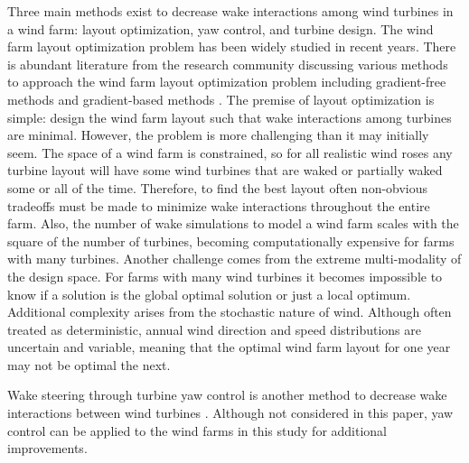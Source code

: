 Three main methods exist to decrease wake interactions among wind turbines in a wind farm: layout optimization, yaw control, and turbine design. The wind farm layout optimization problem has been widely studied in recent years. There is abundant literature from the research community discussing various methods to approach the wind farm layout optimization problem including gradient-free methods \citep{marmidis2008optimal,emami2010new,kusiak2010design,ituarte2011optimization,feng2015solving,gao2015wind} and gradient-based methods \citep{perez2013offshore,park2015layout,Fleming2016,guirguis2016toward,gebraad2017maximization}. The premise of layout optimization is simple: design the wind farm layout such that wake interactions among turbines are minimal.
However, the problem is more challenging than it may initially seem. 
The space of a wind farm is constrained, so for all realistic wind roses any turbine layout will have some wind turbines that are waked or partially waked some or all of the time. Therefore, to find the best layout often non-obvious tradeoffs must be made to minimize wake interactions throughout the entire farm.
Also, the number of wake simulations to model a wind farm scales with the square of the number of turbines, becoming computationally expensive for farms with many turbines. Another challenge comes from the extreme multi-modality of the design space. For farms with many wind turbines it becomes impossible to know if a solution is the global optimal solution or just a local optimum.  Additional complexity arises from the stochastic nature of wind. Although often treated as deterministic, annual wind direction and speed distributions are uncertain and variable, meaning that the optimal wind farm layout for one year may not be optimal the next.



Wake steering through turbine yaw control is another method to decrease wake interactions between wind turbines  \citep{Fleming2016,gebraad2017maximization}. Although not considered in this paper, yaw control can be applied to the wind farms in this study for additional improvements.



